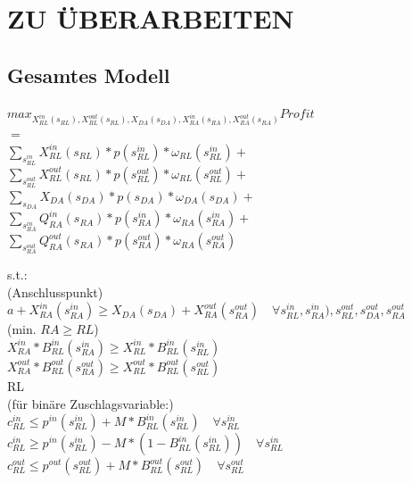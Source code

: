 \documentclass{article}
\begin{document}
\section{ZU ÜBERARBEITEN}


\subsection{Gesamtes Modell}
\begin{center}
$max_{X^{in}_{RL}(s_{RL}), X^{out}_{RL}(s_{RL}), X_{DA}(s_{DA}), X^{in}_{RA}(s_{RA}), X^{out}_{RA}(s_{RA})} Profit $\\
$=$\\
        $\sum_{s^{in}_{RL}} X^{in}_{RL}(s_{RL}) * p(s^{in}_{RL}) * \omega_{RL}(s^{in}_{RL}) +$\\
        $\sum_{s^{out}_{RL}} X^{out}_{RL}(s_{RL}) * p(s^{out}_{RL}) * \omega_{RL}(s^{out}_{RL}) +$\\
        $\sum_{s_{DA}} X_{DA}(s_{DA}) * p(s_{DA}) * \omega_{DA}(s_{DA}) +$\\
	$\sum_{s^{in}_{RA}} Q^{in}_{RA}(s_{RA}) * p(s^{in}_{RA}) * \omega_{RA}(s^{in}_{RA}) +$\\
	$\sum_{s^{out}_{RA}} Q^{out}_{RA}(s_{RA}) * p(s^{out}_{RA}) * \omega_{RA}(s^{out}_{RA})$\\
\end{center}
s.t.:\\
(Anschlusspunkt)\\
        $a + X^{in}_{RA}(s^{in}_{RA}) \geq X_{DA}(s_{DA}) + X^{out}_{RA}(s^{out}_{RA}) \quad\forall s^{in}_{RL},s^{in}_{RA}),s^{out}_{RL},s^{out}_{DA},s^{out}_{RA} $\\
(min. $RA \geq RL$)\\
        $ X^{in}_{RA} * B^{in}_{RL}(s^{in}_{RA}) \geq X^{in}_{RL} * B^{in}_{RL}(s^{in}_{RL})$\\
        $ X^{out}_{RA} * B^{out}_{RL}(s^{out}_{RA}) \geq X^{out}_{RL} * B^{out}_{RL}(s^{out}_{RL})$\\
RL\\
        (für binäre Zuschlagsvariable:)\\
        $c^{in}_{RL} \leq p^{in}(s^{in}_{RL}) + M * B^{in}_{RL}(s^{in}_{RL})\quad\forall s^{in}_{RL} $ \\
        $c^{in}_{RL} \geq p^{in}(s^{in}_{RL}) - M * (1 - B^{in}_{RL}(s^{in}_{RL}))\quad\forall s^{in}_{RL} $ \\
        $c^{out}_{RL} \leq p^{out}(s^{out}_{RL}) + M * B^{out}_{RL}(s^{out}_{RL})\quad\forall s^{out}_{RL} $ \\
\end{document}
